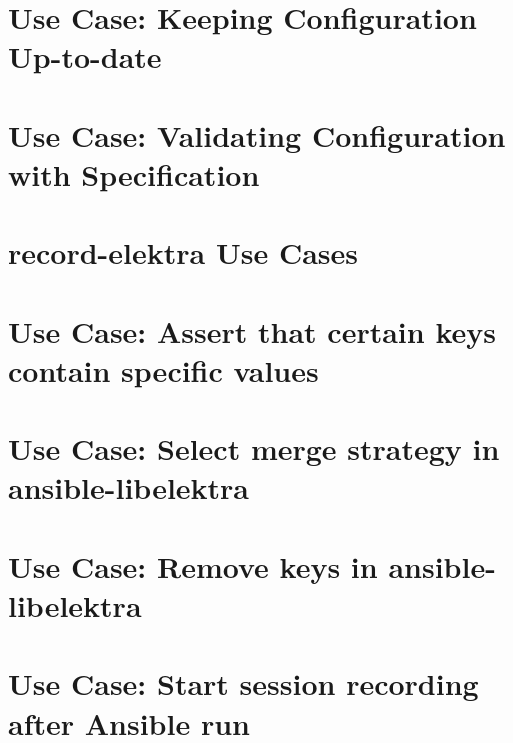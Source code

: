 \let\mypdfximage\pdfximage\def\pdfximage{\immediate\mypdfximage}\documentclass[twoside]{book}
\newcommand{\+}{\discretionary{\mbox{\scriptsize$\hookleftarrow$}}{}{}}
\begin{document}
\chapter{Use Case\+: Keeping Configuration Up-\/to-\/date}
\label{doc_usecases_kdb_UC_uptodate_config_md}

\chapter{Use Case\+: Validating Configuration with Specification}
\label{doc_usecases_kdb_UC_validate_config_md}

\chapter{record-\/elektra Use Cases}
\label{doc_usecases_record_elektra_README_md}

\chapter{Use Case\+: Assert that certain keys contain specific values}
\label{doc_usecases_record_elektra_UC_ansible-libelektra_assert_keys_md}

\chapter{Use Case\+: Select merge strategy in ansible-\/libelektra}
\label{doc_usecases_record_elektra_UC_ansible-libelektra_merge_strategies_md}

\chapter{Use Case\+: Remove keys in ansible-\/libelektra}
\label{doc_usecases_record_elektra_UC_ansible-libelektra_remove_keys_md}

\chapter{Use Case\+: Start session recording after Ansible run}
\label{doc_usecases_record_elektra_UC_ansible-libelektra_start_recording_md}

\end{document}
